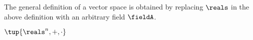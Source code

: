 \begin{remark}
    The general definition of a vector space is obtained by replacing $\reals$ in the above definition with an arbitrary field $\fieldA$.
\end{remark}

\begin{example}
    $\tup{\reals^n, +, \cdot}$
\end{example}



